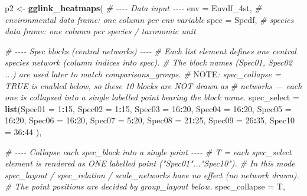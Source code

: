 \documentclass[
]{book}
\newenvironment{Shaded}{\begin{snugshade}}{\end{snugshade}}
\newcommand{\AlertTok}[1]{\textcolor[rgb]{0.94,0.16,0.16}{#1}}
\newcommand{\AttributeTok}[1]{\textcolor[rgb]{0.13,0.29,0.53}{#1}}
\newcommand{\CommentTok}[1]{\textcolor[rgb]{0.56,0.35,0.01}{\textit{#1}}}
\newcommand{\DecValTok}[1]{\textcolor[rgb]{0.00,0.00,0.81}{#1}}
\newcommand{\FunctionTok}[1]{\textcolor[rgb]{0.13,0.29,0.53}{\textbf{#1}}}
\newcommand{\NormalTok}[1]{#1}
\newcommand{\OtherTok}[1]{\textcolor[rgb]{0.56,0.35,0.01}{#1}}
\newcommand{\SpecialCharTok}[1]{\textcolor[rgb]{0.81,0.36,0.00}{\textbf{#1}}}
\begin{document}
\begin{Shaded}
\begin{Highlighting}[]
\NormalTok{p2 }\OtherTok{\textless{}{-}} \FunctionTok{gglink\_heatmaps}\NormalTok{(}
  \CommentTok{\# {-}{-}{-}{-} Data input {-}{-}{-}{-}}
  \AttributeTok{env  =}\NormalTok{ Envdf\_4st,                          }\CommentTok{\# environmental data frame: one column per env variable}
  \AttributeTok{spec =}\NormalTok{ Spedf,                              }\CommentTok{\# species data frame: one column per species / taxonomic unit}

  \CommentTok{\# {-}{-}{-}{-} Spec blocks (central networks) {-}{-}{-}{-}}
  \CommentTok{\# Each list element defines one central species network (column indices into \textasciigrave{}spec\textasciigrave{}).}
  \CommentTok{\# The block names (Spec01, Spec02 ...) are used later to match \textasciigrave{}comparisons\_groups\textasciigrave{}.}
  \CommentTok{\# }\AlertTok{NOTE}\CommentTok{: spec\_collapse = TRUE is enabled below, so these 10 blocks are NOT drawn as}
  \CommentTok{\#       networks — each one is collapsed into a single labelled point bearing the block name.}
  \AttributeTok{spec\_select =} \FunctionTok{list}\NormalTok{(}\AttributeTok{Spec01 =} \DecValTok{1}\SpecialCharTok{:}\DecValTok{15}\NormalTok{,}
                     \AttributeTok{Spec02 =} \DecValTok{1}\SpecialCharTok{:}\DecValTok{15}\NormalTok{,}
                     \AttributeTok{Spec03 =} \DecValTok{16}\SpecialCharTok{:}\DecValTok{20}\NormalTok{,}
                     \AttributeTok{Spec04 =} \DecValTok{16}\SpecialCharTok{:}\DecValTok{20}\NormalTok{,}
                     \AttributeTok{Spec05 =} \DecValTok{16}\SpecialCharTok{:}\DecValTok{20}\NormalTok{,}
                     \AttributeTok{Spec06 =} \DecValTok{16}\SpecialCharTok{:}\DecValTok{20}\NormalTok{,}
                     \AttributeTok{Spec07 =} \DecValTok{5}\SpecialCharTok{:}\DecValTok{20}\NormalTok{,}
                     \AttributeTok{Spec08 =} \DecValTok{21}\SpecialCharTok{:}\DecValTok{25}\NormalTok{,}
                     \AttributeTok{Spec09 =} \DecValTok{26}\SpecialCharTok{:}\DecValTok{35}\NormalTok{,}
                     \AttributeTok{Spec10 =} \DecValTok{36}\SpecialCharTok{:}\DecValTok{44}
\NormalTok{  ),}

  \CommentTok{\# {-}{-}{-}{-} Collapse each spec\_block into a single point {-}{-}{-}{-}}
  \CommentTok{\# T = each spec\_select element is rendered as ONE labelled point ("Spec01"..."Spec10").}
  \CommentTok{\# In this mode spec\_layout / spec\_relation / scale\_networks have no effect (no network drawn).}
  \CommentTok{\# The point positions are decided by \textasciigrave{}group\_layout\textasciigrave{} below.}
  \AttributeTok{spec\_collapse =}\NormalTok{ T,}


\end{Highlighting}
\end{Shaded}
\end{document}
